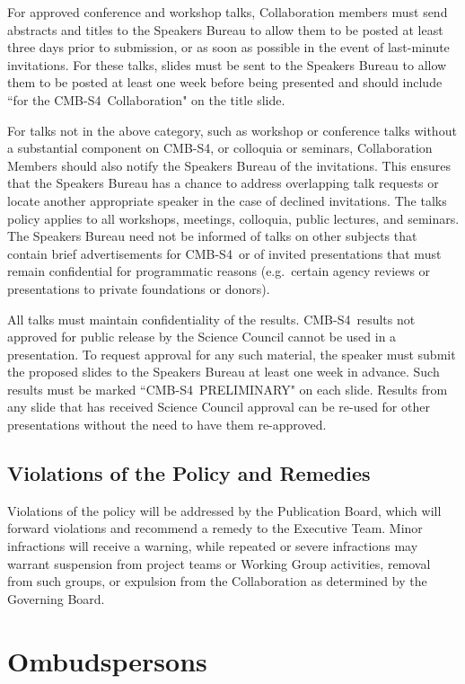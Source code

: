 \documentclass[12pt]{article}
\newcommand\collabname{CMB-S4}
\begin{document}
For approved conference and workshop talks, Collaboration members must send abstracts and titles to the Speakers Bureau to allow them to be posted at least three days prior to submission, or as soon as possible in the event of last-minute invitations. For these talks, slides must be sent to the Speakers Bureau to allow them to be posted at least one week before being presented and should include ``for the \collabname\ Collaboration" on the title slide.

For talks not in the above category, such as workshop or conference talks without a substantial component on \collabname, or colloquia or seminars, Collaboration Members should also notify the Speakers Bureau of the invitations. This ensures that the Speakers Bureau has a chance to address overlapping talk requests or locate another appropriate speaker in the case of declined invitations.  The talks policy applies to all workshops, meetings, colloquia, public lectures, and seminars.  The Speakers Bureau need not be informed of talks on other subjects that contain brief advertisements for \collabname\  or of invited presentations that must remain confidential for programmatic reasons (e.g.~certain agency reviews or presentations to private foundations or donors).

All talks must maintain confidentiality of the results. \collabname\ results not approved for public release by the Science Council cannot be used in a presentation. To request approval for any such material, the speaker must submit the proposed slides to the Speakers Bureau at least one week in advance. Such results must be marked ``\collabname\ PRELIMINARY" on each slide. Results from any slide that has received Science Council approval can be re-used for other presentations without the need to have them re-approved. 

\subsection{Violations of the Policy and Remedies}

Violations of the policy will be addressed by the Publication Board, which will forward violations and recommend a remedy to the Executive Team.  Minor infractions will receive a warning, while repeated or severe infractions may warrant suspension from project teams or Working Group activities, removal from such groups, or expulsion from the Collaboration as determined by the Governing Board.

\section{Ombudspersons}
\end{document}

